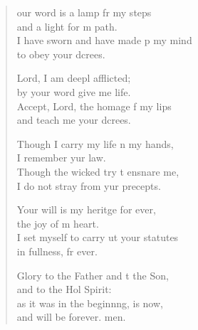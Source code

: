 \settowidth{\versewidth}{I set myself to carry out your statutes *}
\begin{verse}%
  \begin{patverse}
our word is a lamp fr my steps\Med\\
and a light for m path.\\
I have sworn and have made p my mind\Med\\
to obey your dcrees.

Lord, I am deepl afflicted;\Med\\
by your word give me life.\\
Accept, Lord, the homage f my lips\Med\\
and teach me your dcrees.

Though I carry my life n my hands,\Med\\
I remember yur law.\\
Though the wicked try t ensnare me,\Med\\
I do not stray from yur precepts.

Your will is my heritge for ever,\Med\\
the joy of m heart.\\
I set myself to carry ut your statutes\Med\\
in fullness, fr ever.

Glory to the Father and t the Son,\Med\\
and to the Hol Spirit:\\
as it was in the beginnng, is now,\Med\\
and will be forever. men. 
  \end{patverse}
\end{verse}
